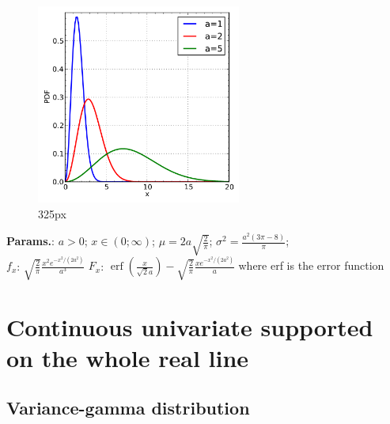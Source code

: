     \begin{figure}[H]
        \centering
        \includegraphics[width=0.6\textwidth]{images/Maxwell-Boltzmann distribution pdf.png}
        \caption{325px}
    \end{figure}




    {\color{darkblue} \textbf{Params.}:} {$a>0$}; {$x\in (0;\infty)$}; {$\mu=2a \sqrt{\frac{2}{\pi}}$}; {$\sigma^2=\frac{a^2(3 \pi - 8)}{\pi}$};\hspace{0.5cm}\\{\color{darkblue} \textbf{$f_x$}:} {$\sqrt{\frac{2}{\pi}} \frac{x^2 e^{-x^2/\left(2a^2\right)}}{a^3}$}{\color{darkblue} \textbf{$F_x$}:} {$\operatorname{erf}\left(\frac{x}{\sqrt{2} a}\right) -\sqrt{\frac{2}{\pi}} \frac{x e^{-x^2/\left(2a^2\right)}}{a} $ where erf is the error function}



    


    \section{Continuous univariate supported on the whole real line}
        

        
    
        
\subsection{Variance-gamma distribution}






